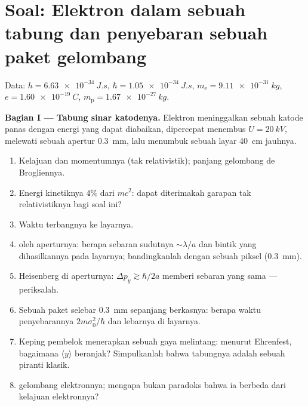 \section{Soal: Elektron dalam sebuah tabung dan penyebaran sebuah paket gelombang}

\begin{problem}\label{pb:b2:schrodinger-wave-functions:1}
Data: $h = \qty{6.63e-34}{J.s}$, $\hbar = \qty{1.05e-34}{J.s}$, $m_{\text{e}} =
\qty{9.11e-31}{kg}$, $e = \qty{1.60e-19}{C}$, $m_{\text{p}} = \qty{1.67e-27}{kg}$.

\textbf{Bagian I --- Tabung sinar katodenya.}
Elektron meninggalkan sebuah katode panas dengan energi yang dapat diabaikan, dipercepat
menembus $U = \qty{20}{kV}$, melewati sebuah apertur \qty{0.3}{mm}, lalu menumbuk sebuah
layar \qty{40}{cm} jauhnya.
\begin{enumerate}
  \item Kelajuan dan momentumnya (tak relativistik); panjang gelombang de Brogliennya.
  \item Energi kinetiknya $4\%$ dari $mc^2$: dapat diterimakah garapan
        tak relativistiknya bagi soal ini?
  \item Waktu terbangnya ke layarnya.
  \item {} oleh aperturnya: berapa sebaran sudutnya $\sim\lambda/a$ dan
        bintik yang dihasilkannya pada layarnya; bandingkanlah dengan sebuah piksel
        (\qty{0.3}{mm}).
  \item Heisenberg di aperturnya: $\Delta p_y \gtrsim \hbar/2a$ memberi
        sebaran yang sama --- periksalah.
  \item Sebuah paket selebar \qty{0.3}{mm} sepanjang berkasnya: berapa waktu penyebarannya
        $2m\sigma_0^2/\hbar$ dan lebarnya di layarnya.
  \item Keping pembelok menerapkan sebuah gaya melintang: menurut Ehrenfest, bagaimana
        $\langle y\rangle$ beranjak? Simpulkanlah bahwa tabungnya adalah sebuah
        piranti klasik.
  \item {} gelombang elektronnya; mengapa bukan paradoks bahwa
        ia berbeda dari kelajuan elektronnya?
\end{enumerate}


\end{problem}
